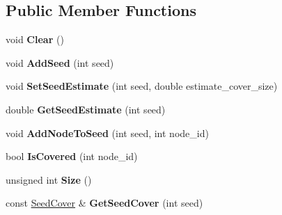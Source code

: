 \subsection*{Public Member Functions}
\begin{DoxyCompactItemize}
\item 
\hypertarget{classall__distance__sketch_1_1Cover_a0703d46dbcfb9f8a9613e1a812ac24af}{}void {\bfseries Clear} ()\label{classall__distance__sketch_1_1Cover_a0703d46dbcfb9f8a9613e1a812ac24af}

\item 
\hypertarget{classall__distance__sketch_1_1Cover_a91636b2e6a4df8339448ead2781f862f}{}void {\bfseries Add\+Seed} (int seed)\label{classall__distance__sketch_1_1Cover_a91636b2e6a4df8339448ead2781f862f}

\item 
\hypertarget{classall__distance__sketch_1_1Cover_afb619d47213da014e2a46041dd267ca1}{}void {\bfseries Set\+Seed\+Estimate} (int seed, double estimate\+\_\+cover\+\_\+size)\label{classall__distance__sketch_1_1Cover_afb619d47213da014e2a46041dd267ca1}

\item 
\hypertarget{classall__distance__sketch_1_1Cover_a9a0b15d23416014c8d5a7ee01f966a8e}{}double {\bfseries Get\+Seed\+Estimate} (int seed)\label{classall__distance__sketch_1_1Cover_a9a0b15d23416014c8d5a7ee01f966a8e}

\item 
\hypertarget{classall__distance__sketch_1_1Cover_a2e28c97e046a454311f58a8f6737b5d5}{}void {\bfseries Add\+Node\+To\+Seed} (int seed, int node\+\_\+id)\label{classall__distance__sketch_1_1Cover_a2e28c97e046a454311f58a8f6737b5d5}

\item 
\hypertarget{classall__distance__sketch_1_1Cover_a7f40f29a281a0a61d675083103e8f5d2}{}bool {\bfseries Is\+Covered} (int node\+\_\+id)\label{classall__distance__sketch_1_1Cover_a7f40f29a281a0a61d675083103e8f5d2}

\item 
\hypertarget{classall__distance__sketch_1_1Cover_ac11eae4d872b1d5bb1c8b781ab75b0b1}{}unsigned int {\bfseries Size} ()\label{classall__distance__sketch_1_1Cover_ac11eae4d872b1d5bb1c8b781ab75b0b1}

\item 
\hypertarget{classall__distance__sketch_1_1Cover_a9be9f7475ab8682cb3ff46ff71cef83c}{}const \hyperlink{namespaceall__distance__sketch_a2c159e46ed1a101b68cb2b23a58c4129}{Seed\+Cover} \& {\bfseries Get\+Seed\+Cover} (int seed)\label{classall__distance__sketch_1_1Cover_a9be9f7475ab8682cb3ff46ff71cef83c}


\end{DoxyCompactItemize}
